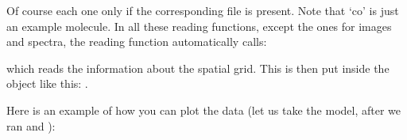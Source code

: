 \documentclass[letterpaper,10pt,english]{sphinxmanual}
\begin{document}
\begin{sphinxVerbatim}[commandchars=\\\{\}]
  
  
  
  
  
  
  
  
  
\end{sphinxVerbatim}

Of course each one only if the corresponding file is present. Note that ‘co’ is
just an example molecule. In all these reading functions, except the ones for
images and spectra, the reading function automatically calls:

\begin{sphinxVerbatim}[commandchars=\\\{\}]
  
\end{sphinxVerbatim}

which reads the information about the spatial grid. This is then put inside the
 object like this: .

Here is an example of how you can plot the data (let us take the
 model, after we ran 
and ):
\end{document}
